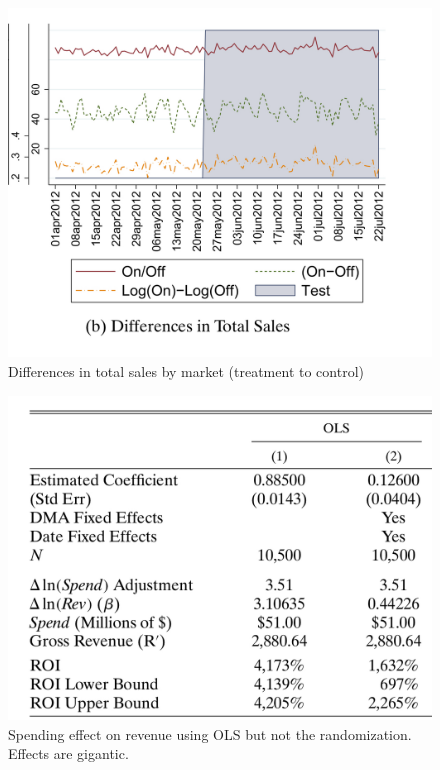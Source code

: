 \documentclass{beamer}
\begin{document}
\begin{frame}

  \begin{figure}
    \begin{center}
      \includegraphics[scale=0.2]{./lecture_includes/tadelis_fig2.png}
      \caption{Differences in total sales by market (treatment to control)}
    \end{center}
  \end{figure}

\end{frame}

\begin{frame}

  \begin{figure}
    \begin{center}
      \includegraphics[scale=0.2]{./lecture_includes/tadelis_ols1.png}
      \caption{Spending effect on revenue using OLS but not the randomization. Effects are gigantic. }
    \end{center}
  \end{figure}

\end{frame}
\end{document}
